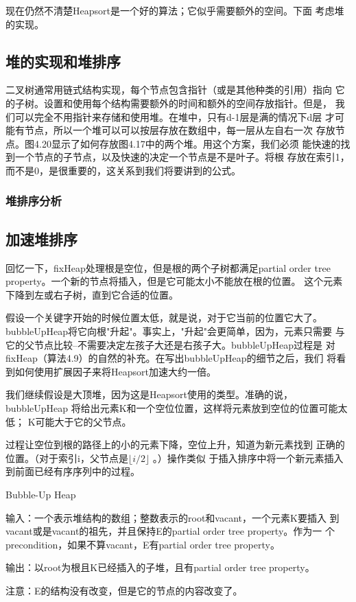 现在仍然不清楚Heapsort是一个好的算法；它似乎需要额外的空间。下面
考虑堆的实现。

\subsection{堆的实现和堆排序}\label{Sec:ImplementationOfHeapAndHeapsort}
二叉树通常用链式结构实现，每个节点包含指针（或是其他种类的引用）指向
它的子树。设置和使用每个结构需要额外的时间和额外的空间存放指针。但是，
我们可以完全不用指针来存储和使用堆。在堆中，只有d-1层是满的情况下d层
才可能有节点，所以一个堆可以可以按层存放在数组中，每一层从左自右一次
存放节点。图4.20显示了如何存放图4.17中的两个堆。用这个方案，我们必须
能快速的找到一个节点的子节点，以及快速的决定一个节点是不是叶子。将根
存放在索引1，而不是0，是很重要的，这关系到我们将要讲到的公式。

\subsubsection{堆排序分析}
\subsection{加速堆排序}
回忆一下，fixHeap处理根是空位，但是根的两个子树都满足partial order
tree property。一个新的节点将插入，但是它可能太小不能放在根的位置。
这个元素下降到左或右子树，直到它合适的位置。

假设一个关键字开始的时候位置太低，就是说，对于它当前的位置它大了。
bubbleUpHeap将它向根"升起"。事实上，"升起"会更简单，因为，元素只需要
与它的父节点比较--不需要决定左孩子大还是右孩子大。bubbleUpHeap过程是
对fixHeap（算法4.9）的自然的补充。在写出bubbleUpHeap的细节之后，我们
将看到如何使用扩展因子来将Heapsort加速大约一倍。

我们继续假设是大顶堆，因为这是Heapsort使用的类型。准确的说，bubbleUpHeap
将给出元素K和一个空位位置，这样将元素放到空位的位置可能太低；
K可能大于它的父节点。

过程让空位到根的路径上的小的元素下降，空位上升，知道为新元素找到
正确的位置。（对于索引i，父节点是$\lfloor i/2 \rfloor$ 。）操作类似
于插入排序中将一个新元素插入到前面已经有序序列中的过程。

\begin{algorithm}
Bubble-Up Heap

输入：一个表示堆结构的数组；整数表示的root和vacant，一个元素K要插入
到vacant或是vacant的祖先，并且保持E的partial order tree property。作为一
个precondition，如果不算vacant，E有partial order tree property。

输出：以root为根且K已经插入的子堆，且有partial order tree property。

注意：E的结构没有改变，但是它的节点的内容改变了。

\end{algorithm}

